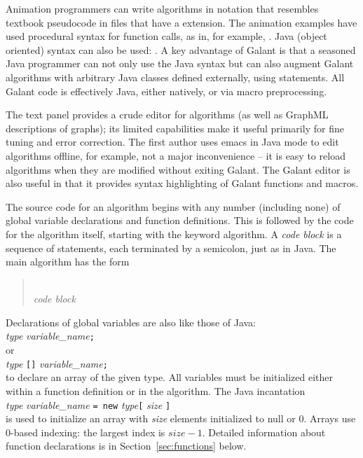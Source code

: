Animation programmers can write algorithms in notation that resembles
textbook pseudocode
in files that have a  extension.
The animation examples have used procedural syntax for function calls, as in, for example,
.
Java (object oriented) syntax can also be used: .
A key advantage of Galant is that a seasoned Java programmer can
not only use the Java syntax but can also augment Galant algorithms with
arbitrary Java classes defined externally, using  statements.
All Galant code is effectively Java, either natively, or via macro preprocessing.

The text panel provides a crude editor for algorithms (as well as GraphML
descriptions of graphs);
its limited capabilities make it useful primarily for fine tuning and error correction.
The first author uses emacs in Java mode to edit algorithms offline, for example,
not a major inconvenience -- it is easy to reload algorithms when they are modified
without exiting Galant.
The Galant editor is also useful in that it provides syntax highlighting of Galant
functions and macros.

The source code for an algorithm begins with any number (including none)
of global variable declarations and function definitions.
This is followed by the code for the algorithm itself, starting with the keyword
\textsf{algorithm}.
A \emph{code block}
is a sequence of statements, each terminated by a semicolon, just as in
Java.
The main algorithm has the form
\begin{quote}
\\
\hspace*{2em}\emph{code block}\\
\Code{\}}
\end{quote}

Declarations of global variables are also like those of Java:\\
\hspace*{1em}\emph{type} \emph{variable\_name}\texttt{;}\\
or\\
\hspace*{1em}\emph{type} \texttt{[]} \emph{variable\_name}\texttt{;}\\
to declare an array of the given type.
All variables must be initialized either within a function definition or
in the algorithm.
The Java incantation\\
\hspace*{1em}\emph{type} \emph{variable\_name}
\texttt{= new} \emph{type}\texttt{[} \emph{size} \texttt{]}\\
is used to initialize an array with \emph{size} elements initialized to \textsf{null}
or 0.
Arrays use 0-based indexing: the largest index is $\mathit{size} - 1$.
Detailed
information about function declarations is in Section~\ref{sec:functions}
below.

